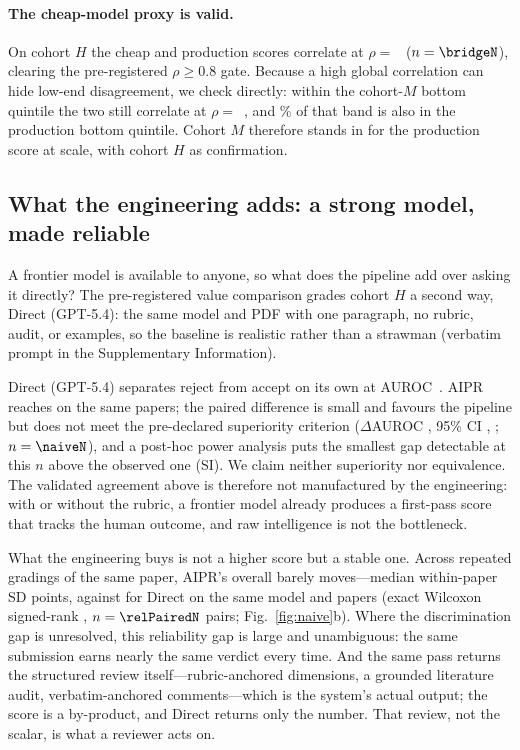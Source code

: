 \paragraph{The cheap-model proxy is valid.}
On cohort $H$ the cheap and production scores correlate at $\rho=$~\bridgeRhoFull{}
($n=\bridgeN$), clearing the pre-registered $\rho\ge0.8$ gate. Because a high global
correlation can hide low-end disagreement, we check directly: within the cohort-$M$ bottom
quintile the two still correlate at $\rho=$~\bridgeLowRhoFull{}, and \bridgeOverlap\% of that
band is also in the production bottom quintile. Cohort $M$ therefore stands in for the
production score at scale, with cohort $H$ as confirmation.

\subsection{What the engineering adds: a strong model, made reliable}
\label{sec:res-value}
A frontier model is available to anyone, so what does the pipeline add over asking it
directly? The pre-registered value comparison grades cohort $H$ a second way, Direct
(GPT-5.4): the same model and PDF with one paragraph, no rubric, audit, or examples, so the
baseline is realistic rather than a strawman (verbatim prompt in the Supplementary
Information).

Direct (GPT-5.4) separates reject from accept on its own at AUROC~\aurocNaiveFull{}. AIPR
reaches \aurocFullFull{} on the same papers; the paired difference is small and favours the
pipeline but does not meet the pre-declared superiority criterion ($\Delta$AUROC
\aurocDiffFullNaive, 95\% CI \aurocDiffCI, \aurocDiffPrel; $n=\naiveN$), and a post-hoc power
analysis puts the smallest gap detectable at this $n$ above the observed one (SI). We claim
neither superiority nor equivalence. The validated agreement above is therefore not
manufactured by the engineering: with or without the rubric, a frontier model already
produces a first-pass score that tracks the human outcome, and raw intelligence is not the
bottleneck.

What the engineering buys is not a higher score but a stable one. Across repeated gradings of
the same paper, AIPR's overall barely moves---median within-paper SD \fullRunSD{} points,
against \naiveRunSD{} for Direct on the same model and papers (exact Wilcoxon signed-rank
\relPairedP{}, $n=\relPairedN$ pairs; Fig.~\ref{fig:naive}b). Where the discrimination gap is
unresolved, this reliability gap is large and unambiguous: the same submission earns nearly
the same verdict every time. And the same pass returns the structured review
itself---rubric-anchored dimensions, a grounded literature audit, verbatim-anchored
comments---which is the system's actual output; the score is a by-product, and Direct returns
only the number. That review, not the scalar, is what a reviewer acts on.

